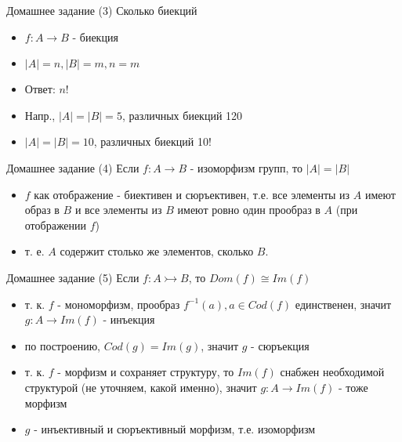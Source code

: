 \documentclass{beamer}
\begin{document}
\begin{frame}{Домашнее задание (3)}
Сколько биекций\\
\bigskip
  \begin{itemize}
    \item $f : A \to B$ - биекция
    \item $\left\vert{A}\right\vert = n, \left\vert{B}\right\vert = m, n = m$
    \item Ответ: $n!$
    \item Напр., $\left\vert{A}\right\vert = \left\vert{B}\right\vert = 5$, различных биекций 120 
    \item $\left\vert{A}\right\vert = \left\vert{B}\right\vert = 10$, различных биекций 10! 
  \end{itemize}  
\end{frame}

\begin{frame}{Домашнее задание (4)}
Если $f : A \to B$ - изоморфизм групп, то $\left\vert{A}\right\vert = \left\vert{B}\right\vert$\\
\bigskip 
  \begin{itemize}
    \item $f$ как отображение - биективен и сюръективен, т.е. все элементы из $A$ имеют образ в $B$ и все элементы из $B$ имеют ровно один прообраз в $A$ (при отображении $f$)
    \item т. е. $A$ содержит столько же элементов, сколько $B$.
  \end{itemize}  
\end{frame}

\begin{frame}{Домашнее задание (5)}
Если $f : A \rightarrowtail B$, то $Dom(f) \cong Im(f)$\\
\bigskip
  \begin{itemize}
    \item т. к. $f$ - мономорфизм, прообраз $f^{-1}(a), a \in Cod(f)$ единственен, значит $g : A \to Im(f)$ - инъекция
    \item по построению, $Cod(g) = Im(g)$, значит $g$ - сюръекция 
    \item т. к. $f$ - морфизм и сохраняет структуру, то $Im(f)$ снабжен необходимой структурой (не уточняем, какой именно), значит $g : A \to Im(f)$ - тоже морфизм
    \item $g$ - инъективный и сюръективный морфизм, т.е. изоморфизм
  \end{itemize}  
\end{frame}
\end{document}
